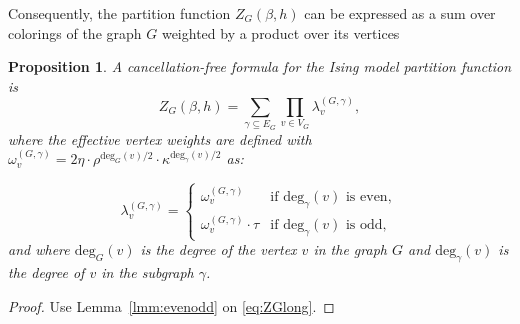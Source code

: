 \documentclass{article}
\numberwithin{theorem}{section}
\newtheorem{proposition}[theorem]{Proposition}
\theoremstyle{remark}
\newcommand{\degv}{\mathrm{deg}}
\begin{document}
Consequently, the partition function $Z_G(\beta,h)$ can be expressed as a sum over colorings of the graph $G$
weighted by a product over its vertices
\begin{proposition}
  \label{prop:combinatorial_formula_partition_fct}
A cancellation-free formula for the Ising model partition function is
\begin{equation*}
    Z_G(\beta,h) = \sum_{\gamma \subseteq E_G} \prod_{v\in V_G} \lambda_{v}^{(G,\gamma)},
\end{equation*}
where the effective vertex weights are defined with $\omega^{(G,\gamma)}_v = 2\eta\cdot \rho^{\degv_G(v)/2}\cdot \kappa^{\degv_\gamma(v)/2}$ as:

\begin{equation}
\label{eq:comb_vtx_weights}
    \lambda_{v}^{(G,\gamma)} = 
    \begin{cases}
        \omega^{(G,\gamma)}_v  & \text{if } \degv_\gamma(v) \text{ is even}, \\
        \omega^{(G,\gamma)}_v \cdot \tau & \text{if } \degv_\gamma(v) \text{ is odd},
    \end{cases}
\end{equation}
and 
where $\degv_G(v)$ is the degree of the vertex $v$ in the graph $G$ and 
$\degv_\gamma(v)$ is the degree of $v$ in the subgraph $\gamma$.
\end{proposition}
\begin{proof}
Use Lemma~\ref{lmm:evenodd} on \eqref{eq:ZGlong}.
\end{proof}
\end{document}
